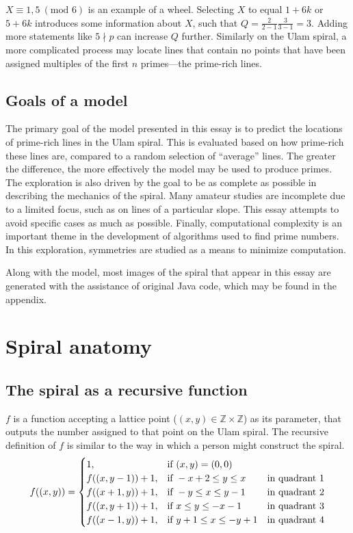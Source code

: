 \documentclass{article}
\begin{document}
\(X \equiv 1,5\ (\text{mod }6)\) is an example of a wheel. Selecting \(X\) to equal \(1+6k\) or \(5+6k\) introduces some information about \(X\), such that \(Q=\frac{2}{2-1}\frac{3}{3-1}=3\). Adding more statements like \(5 \nmid p\) can increase \(Q\) further. Similarly on the Ulam spiral, a more complicated process may locate lines that contain no points that have been assigned multiples of the first \(n\) primes---the prime-rich lines.


\subsection{Goals of a model}

The primary goal of the model presented in this essay is to predict the locations of prime-rich lines in the Ulam spiral. This is evaluated based on how prime-rich these lines are, compared to a random selection of ``average'' lines. The greater the difference, the more effectively the model may be used to produce primes. The exploration is also driven by the goal to be as complete as possible in describing the mechanics of the spiral. Many amateur studies are incomplete due to a limited focus, such as on lines of a particular slope. This essay attempts to avoid specific cases as much as possible. Finally, computational complexity is an important theme in the development of algorithms used to find prime numbers. In this exploration, symmetries are studied as a means to minimize computation.

Along with the model, most images of the spiral that appear in this essay are generated with the assistance of original Java code, which may be found in the appendix.



\section{Spiral anatomy}

\subsection{The spiral as a recursive function}

\(f\) is a function accepting a lattice point (\((x,y) \in \mathbb{Z}\times\mathbb{Z}\)) as its parameter, that outputs the number assigned to that point on the Ulam spiral. The recursive definition of \(f\) is similar to the way in which a person might construct the spiral.
	\[f((x,y)) = \begin{cases}
				 1,				&\text{if } (x,y) = (0,0) \\
				 f((x,y-1))+1,	&\text{if } -x+2 \leq y \leq x		\hfill \quad \text{in quadrant } 1\\
				 f((x+1,y))+1,	&\text{if } -y\leq x \leq y-1		\hfill \quad \text{in quadrant } 2\\
				 f((x,y+1))+1,	&\text{if } x \leq y \leq -x-1		\hfill \quad \text{in quadrant } 3\\
				 f((x-1,y))+1,	&\text{if } y+1 \leq x \leq -y+1	\hfill \quad \text{in quadrant } 4
				 \end{cases}\]
\end{document}
